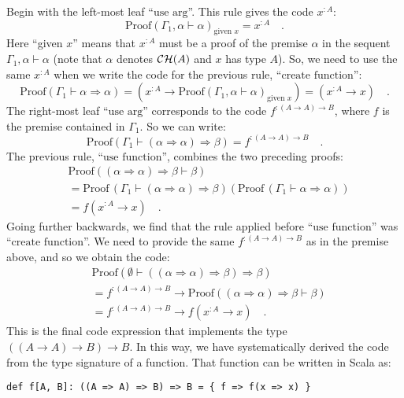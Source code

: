 Begin with the left-most leaf \textsf{``}$\text{use arg}$\textsf{''}. This rule gives
the code $x^{:A}$:
\[
\text{Proof}\left(\Gamma_{1},\alpha\vdash\alpha\right)_{\text{given }x}=x^{:A}\quad.
\]
Here \textsf{``}given $x$\textsf{''} means that $x^{:A}$ must be a proof of the
premise $\alpha$ in the sequent $\Gamma_{1},\alpha\vdash\alpha$
(note that $\alpha$ denotes ${\cal CH}(A)$ and $x$ has type $A$).
So, we need to use the same $x^{:A}$ when we write the code for the
previous rule, \textsf{``}$\text{create function}$\textsf{''}:
\[
\text{Proof}\left(\Gamma_{1}\vdash\alpha\Rightarrow\alpha\right)=(x^{:A}\rightarrow\text{Proof}\left(\Gamma_{1},\alpha\vdash\alpha\right)_{\text{given }x})=(x^{:A}\rightarrow x)\quad.
\]
The right-most leaf \textsf{``}$\text{use arg}$\textsf{''} corresponds to the code
$f^{:(A\rightarrow A)\rightarrow B}$, where $f$ is the premise contained
in $\Gamma_{1}$. So we can write:
\[
\text{Proof}\left(\Gamma_{1}\vdash(\alpha\Rightarrow\alpha)\Rightarrow\beta\right)=f^{:(A\rightarrow A)\rightarrow B}\quad.
\]
The previous rule, \textsf{``}$\text{use function}$\textsf{''}, combines the two
preceding proofs:
\begin{align*}
 & \text{Proof}\left((\alpha\Rightarrow\alpha)\Rightarrow\beta\vdash\beta\right)\\
 & =\text{Proof}\,(\Gamma_{1}\vdash(\alpha\Rightarrow\alpha)\Rightarrow\beta)\left(\text{Proof}\,(\Gamma_{1}\vdash\alpha\Rightarrow\alpha)\right)\\
 & =f(x^{:A}\rightarrow x)\quad.
\end{align*}
Going further backwards, we find that the rule applied before \textsf{``}$\text{use function}$\textsf{''}
was \textsf{``}$\text{create function}$\textsf{''}. We need to provide the same $f^{:\left(A\rightarrow A\right)\rightarrow B}$
as in the premise above, and so we obtain the code:
\begin{align*}
 & \text{Proof}\left(\emptyset\vdash((\alpha\Rightarrow\alpha)\Rightarrow\beta)\Rightarrow\beta\right)\\
 & =f^{:\left(A\rightarrow A\right)\rightarrow B}\rightarrow\text{Proof}\left((\alpha\Rightarrow\alpha)\Rightarrow\beta\vdash\beta\right)\\
 & =f^{:\left(A\rightarrow A\right)\rightarrow B}\rightarrow f(x^{:A}\rightarrow x)\quad.
\end{align*}
This is the final code expression that implements the type $((A\rightarrow A)\rightarrow B)\rightarrow B$.
In this way, we have systematically derived the code from the type
signature of a function. That function can be written in Scala as:
\begin{lstlisting}
def f[A, B]: ((A => A) => B) => B = { f => f(x => x) }
\end{lstlisting}

